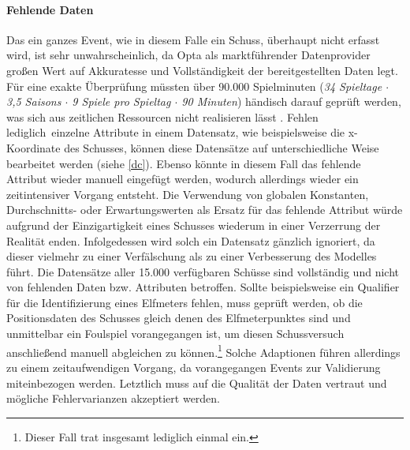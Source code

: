 \paragraph{Fehlende Daten}
Das ein ganzes Event, wie in diesem Falle ein Schuss, überhaupt nicht erfasst wird, ist sehr unwahrscheinlich, da Opta als marktführender Datenprovider großen Wert auf Akkuratesse und Vollständigkeit der bereitgestellten Daten legt. Für eine exakte Überprüfung müssten über 90.000 Spielminuten (\textit{34 Spieltage $\cdot$ 3,5 Saisons $\cdot$ 9 Spiele pro Spieltag $\cdot$ 90 Minuten}) händisch darauf geprüft werden, was sich aus zeitlichen Ressourcen nicht realisieren lässt	. Fehlen \glqq lediglich\grqq~einzelne Attribute in einem Datensatz, wie beispielsweise die x-Koordinate des Schusses, können diese Datensätze auf unterschiedliche Weise bearbeitet werden (siehe \vref{dc}). Ebenso könnte in diesem Fall das fehlende Attribut wieder manuell eingefügt werden, wodurch allerdings wieder ein zeitintensiver Vorgang entsteht. Die Verwendung von globalen Konstanten, Durchschnitts- oder Erwartungswerten als Ersatz für das fehlende Attribut würde aufgrund der Einzigartigkeit eines Schusses wiederum in einer Verzerrung der Realität enden. Infolgedessen wird solch ein Datensatz gänzlich ignoriert, da dieser vielmehr zu einer Verfälschung als zu einer Verbesserung des Modelles führt. Die Datensätze aller 15.000 verfügbaren Schüsse sind vollständig und nicht von fehlenden Daten bzw. Attributen betroffen. Sollte beispielsweise ein Qualifier für die Identifizierung eines Elfmeters fehlen, muss geprüft werden, ob die Positionsdaten des Schusses gleich denen des Elfmeterpunktes sind und unmittelbar ein Foulspiel vorangegangen ist, um diesen Schussversuch anschließend manuell abgleichen zu können.\footnote{Dieser Fall trat insgesamt lediglich einmal ein.} Solche Adaptionen führen allerdings zu einem zeitaufwendigen Vorgang, da vorangegangen Events zur Validierung miteinbezogen werden. Letztlich muss auf die Qualität der Daten vertraut und mögliche Fehlervarianzen akzeptiert werden.

